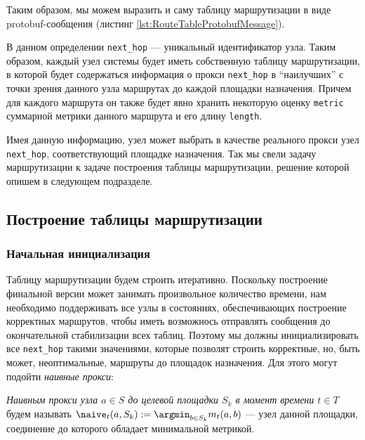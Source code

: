 Таким образом, мы можем выразить и саму таблицу маршрутизации в виде protobuf-сообщения (листинг \ref{lst:RouteTableProtobufMessage}).
    

В данном определении \texttt{next\_hop} --- уникальный идентификатор узла. Таким образом, каждый узел системы будет иметь собственную таблицу маршрутизации, в которой будет содержаться информация о прокси \texttt{next\_hop} в \enquote{наилучших} с точки зрения данного узла маршрутах до каждой площадки назначения. Причем для каждого маршрута он также будет явно хранить некоторую оценку \texttt{metric} суммарной метрики данного маршрута и его длину \texttt{length}.

Имея данную информацию, узел может выбрать в качестве реального прокси узел \texttt{next\_hop}, соответствующий площадке назначения. Так мы свели задачу маршрутизации к задаче построения таблицы маршрутизации, решение которой опишем в следующем подразделе.

\subsection{Построение таблицы маршрутизации}

\subsubsection{Начальная инициализация}
\label{RT_Initialization}

Таблицу маршрутизации будем строить итеративно. Поскольку построение финальной версии может занимать произвольное количество времени, нам необходимо поддерживать все узлы в состояниях, обеспечивающих построение корректных маршрутов, чтобы иметь возможнось отправлять сообщения до окончательной стабилизации всех таблиц. Поэтому мы должны инициализировать все \texttt{next\_hop} такими значениями, которые позволят строить корректные, но, быть может, неоптимальные, маршруты до площадок назначения. Для этого могут подойти \textit{наивные прокси}:

\begin{definition}
    \textit{Наивным прокси узла $a \in S$ до целевой площадки $S_k$ в момент времени $t \in T$} будем называть $\naive_t(a, S_k) := \displaystyle \argmin_{b \in S_k} m_t(a, b)$ --- узел данной площадки, соединение до которого обладает минимальной метрикой.
\end{definition}

